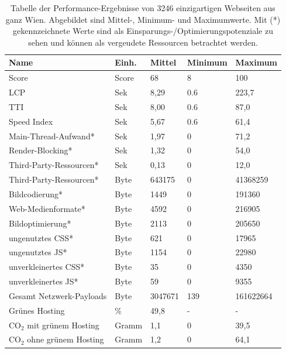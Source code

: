 \documentclass[Bachelor,BIF,german,IEEE]{BASE/twbook}
\begin{document}
\begin{table}[h]
\centering
\begin{tabularx}{\textwidth}{|l|l|X|X|X|}
\hline
Name                        & Einh. & Mittel    & Minimum   & Maximum      \\ \hline
Score                       & Score & 68        & 8         & 100      \\ \hline
\ac{LCP}                    & Sek   & 8,29      & 0.6       & 223,7    \\
\ac{TTI}                    & Sek   & 8,00      & 0.6       & 87,0     \\
Speed Index                 & Sek   & 5,67      & 0.6       & 61,4     \\
Main-Thread-Aufwand*        & Sek   & 1,97      & 0         & 71,2     \\
Render-Blocking*            & Sek   & 1,32      & 0         & 54,0     \\
Third-Party-Ressourcen*     & Sek   & 0,13      & 0         & 12,0     \\ \hline
Third-Party-Ressourcen*     & Byte  & 643175    & 0         & 41368259 \\
Bildcodierung*              & Byte  & 1449      & 0         & 191360   \\
Web-Medienformate*          & Byte  & 4592      & 0         & 216905   \\
Bildoptimierung*            & Byte  & 2113      & 0         & 205650   \\
ungenutztes CSS*            & Byte  & 621       & 0         & 17965    \\
ungenutztes JS*             & Byte  & 1154      & 0         & 22980    \\
unverkleinertes CSS*        & Byte  & 35        & 0         & 4350     \\
unverkleinertes JS*         & Byte  & 59        & 0         & 9355     \\
Gesamt Netzwerk-Payloads    & Byte  & 3047671   & 139       & 161622664 \\  \hline
Grünes Hosting              & \%    & 49,8      & -         & -        \\  \hline
CO$_2$ mit grünem Hosting   & Gramm & 1,1       & 0         & 39,5     \\
CO$_2$ ohne grünem Hosting  & Gramm & 1,2       & 0         & 64,1     \\ \hline
\end{tabularx}
\caption{Tabelle der Performance-Ergebnisse von 3246 einzigartigen Webseiten aus ganz Wien. Abgebildet sind Mittel-, Minimum- und Maximumwerte. Mit (*) gekennzeichnete Werte sind als Einsparungs-/Optimierungspotenziale zu sehen und können als vergeudete Ressourcen betrachtet werden.}
\label{tab:performance_values}
\end{table}
\end{document}
